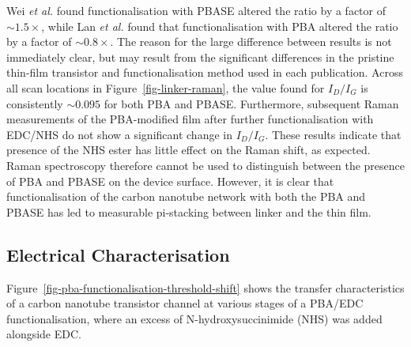 \documentclass[
  a4paper,
]{scrbook}
\begin{document}
Wei \emph{et al.} \autocite{Wei2010} found functionalisation with PBASE
altered the ratio by a factor of \(\sim 1.5 \times\), while Lan \emph{et
al.} \autocite{Lan2013} found that functionalisation with PBA altered
the ratio by a factor of \(\sim 0.8 \times\). The reason for the large
difference between results is not immediately clear, but may result from
the significant differences in the pristine thin-film transistor and
functionalisation method used in each publication. Across all scan
locations in Figure~\ref{fig-linker-raman}, the value found for
\(I_D/I_G\) is consistently \(\sim 0.095\) for both PBA and PBASE.
Furthermore, subsequent Raman measurements of the PBA-modified film
after further functionalisation with EDC/NHS do not show a significant
change in \(I_D/I_G\). These results indicate that presence of the NHS
ester has little effect on the Raman shift, as expected. Raman
spectroscopy therefore cannot be used to distinguish between the
presence of PBA and PBASE on the device surface. However, it is clear
that functionalisation of the carbon nanotube network with both the PBA
and PBASE has led to measurable pi-stacking between linker and the thin
film.

\hypertarget{sec-PBA-characterisation}{%
\subsection{Electrical
Characterisation}\label{sec-PBA-characterisation}}

Figure~\ref{fig-pba-functionalisation-threshold-shift} shows the
transfer characteristics of a carbon nanotube transistor channel at
various stages of a PBA/EDC functionalisation, where an excess of
N-hydroxysuccinimide (NHS) was added alongside EDC.
\end{document}

